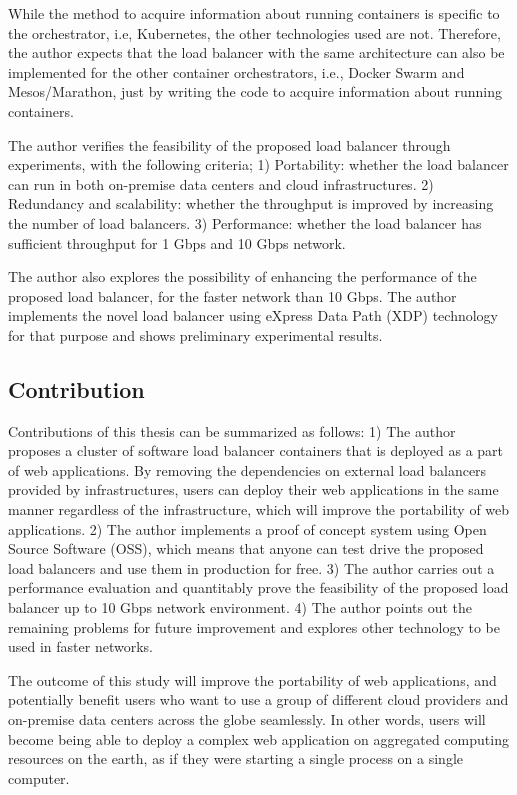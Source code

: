 While the method to acquire information about running containers is specific to the orchestrator, i.e, Kubernetes, the other technologies used are not.
Therefore, the author expects that the load balancer with the same architecture can also be implemented for the other container orchestrators, i.e., Docker Swarm and Mesos/Marathon, just by writing the code to acquire information about running containers.



The author verifies the feasibility of the proposed load balancer through experiments, with the following criteria;
1) Portability: whether the load balancer can run in both on-premise data centers and cloud infrastructures.
2) Redundancy and scalability: whether the throughput is improved by increasing the number of load balancers.
3) Performance: whether the load balancer has sufficient throughput for 1 Gbps and 10 Gbps network.



The author also explores the possibility of enhancing the performance of the proposed load balancer, for the faster network than 10 Gbps.
The author implements the novel load balancer using eXpress Data Path (XDP) technology \cite{bertin2017xdp} for that purpose and shows preliminary experimental results.




\subsection{Contribution}

Contributions of this thesis can be summarized as follows:
1) The author proposes a cluster of software load balancer containers that is deployed as a part of web applications.
By removing the dependencies on external load balancers provided by infrastructures, users can deploy their web applications in the same manner regardless of the infrastructure, which will improve the portability of web applications.
2) The author implements a proof of concept system using Open Source Software (OSS), which means that anyone can test drive the proposed load balancers and use them in production for free.
3) 
The author carries out a performance evaluation and quantitably prove the feasibility of the proposed load balancer up to 10 Gbps network environment.
4) The author points out the remaining problems for future improvement and explores other technology to be used in faster networks.

The outcome of this study will improve the portability of web applications, and potentially benefit users who want to use a group of different cloud providers and on-premise data centers across the globe seamlessly.
In other words, users will become being able to deploy a complex web application on aggregated computing resources on the earth, as if they were starting a single process on a single computer.

